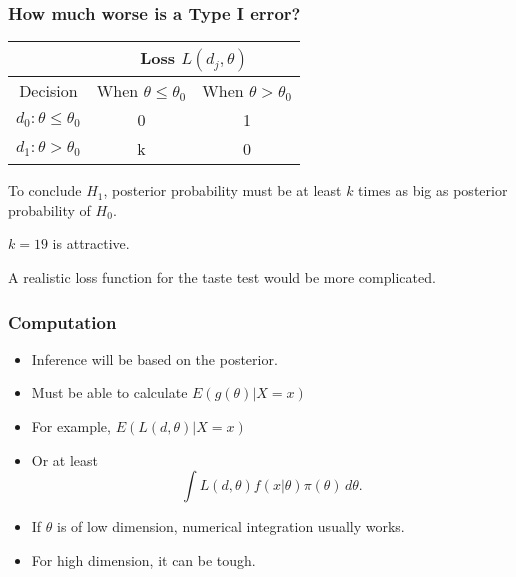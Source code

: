 \documentclass[12pt]{beamer}
\begin{document}
	\begin{frame}
		\frametitle{How much worse is a Type I error?}
		
		\begin{center}
			\begin{tabular}{|c|c|c|}
				\hline
				& \multicolumn{2}{c|}{Loss $L(d_j,\theta)$} \\
				\hline
				Decision & When $\theta \leq \theta_0$ & When $\theta > \theta_0$ \\
				\hline
				$d_0: \theta \leq \theta_0$ & 0 & 1 \\
				\hline
				$d_1: \theta > \theta_0$ & k & 0 \\
				\hline
			\end{tabular}
		\end{center}
		
		To conclude $H_1$, posterior probability must be at least $k$ times as big as posterior probability of $H_0$.
		
		$k = 19$ is attractive.
		
		A realistic loss function for the taste test would be more complicated.
		
	\end{frame}
	\begin{frame}
		\frametitle{Computation}
		
		\begin{itemize}[label={\color{blue}$\blacktriangleright$}]
			\item Inference will be based on the posterior.
			\item Must be able to calculate $E(g(\theta)|X = x)$
			\item For example, $E(L(d,\theta)|X = x)$
			\item Or at least
			\[ \int L(d,\theta)f(x|\theta)\pi(\theta)\,d\theta. \]
			\item If $\theta$ is of low dimension, numerical integration usually works.
			\item For high dimension, it can be tough.
		\end{itemize}
		
	\end{frame}
\end{document}
